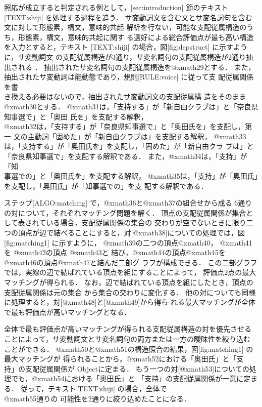照応が成立すると判定される例として，[sec:introduction] 節のテキスト
[TEXT:shiji] を処理する過程を追う．
サ変動詞文を含む文とサ変名詞句を含む文に対して形態素，構文，意味的共起
解析を行ない，可能な支配従属構造のうち，形態素，構文，意味的共起に関す
る選好による総合評価点が最も高い構造を入力とすると，テキスト
[TEXT:shiji] の場合，図[fig:depstruct] に示すように，サ変動詞文
の支配従属構造が3通り，サ変名詞句の支配従属構造が2通り抽出される
．
抽出されたサ変名詞句の支配従属構造を@xmath29とする．
また，抽出されたサ変動詞は能動態であり，規則[RULE:voice] に従って支
配従属関係を書\\き換える必要はないので，抽出されたサ変動詞文の支配従属構
造をそのまま@xmath30とする．
@xmath31は，「支持する」が「新自由クラブは」と「奈良県知事選で」と「奥田
氏を」を支配する解釈，\\
@xmath32は，「支持する」が「奈良県知事選で」と「奥田氏を」を支配し，第一
文の主動詞「固めた」が「新自由クラブは」を支配する解釈，
@xmath33は，「支持する」が「奥田氏を」を支配し，「固めた」が「新自由クラ
ブは」と「奈良県知事選で」を支配する解釈である．
また，@xmath34は，「支持」が「知\\事選での」と「奥田氏を」を支配する解釈，
@xmath35は，「支持」が「奥田氏」を支配し，「奥田氏」が「知事選での」を支
配する解釈である．


ステップ[ALGO:matching] で，@xmath36と@xmath37の組合せから成る
6通りの対について，それぞれマッチング問題を解く．
頂点の支配従属関係が集合として表されている場合，支配従属関係の集合の
交わりが空でないときに限り二つの頂点が辺で結べることにすると，対[@xmath38]についての処理では，図[fig:matching1] に示すように，
@xmath39の二つの頂点@xmath40，
@xmath41を
@xmath42の頂点
@xmath43と
結び，@xmath44の頂点@xmath45を
@xmath46の頂点@xmath47と結んだ二部グ
ラフが構成できる．
この二部グラフでは，実線の辺で結ばれている頂点を組にすることによって，
評価点2点の最大マッチングが得られる．
なお，辺で結ばれている頂点を組にしたとき，頂点の支配従属関係は元の集合
から集合の交わりに変化する．
他の対についても同様に処理すると，対[@xmath48]と[@xmath49]から得ら
れる最大マッチングが全体で最も評価点が高いマッチングとなる．


全体で最も評価点が高いマッチングが得られる支配従属構造の対を優先させる
ことによって，サ変動詞文とサ変名詞句の両方または一方の曖昧性を絞り込む
ことができる．
@xmath50と@xmath51の構造照合の結果，図[fig:matching1] の最大マッチングが
得られることから，@xmath52における「奥田氏」と「支\\持」の支配従属関係が
Objectに定まる．
もう一つの対[@xmath53]についての処理でも，@xmath54における「奥田氏」と
「支持」の支配従属関係が一意に定まる．
従って，テキスト[TEXT:shiji] の場合，全体で\\@xmath55通りの
可能性を2通りに絞り込めたことになる．

